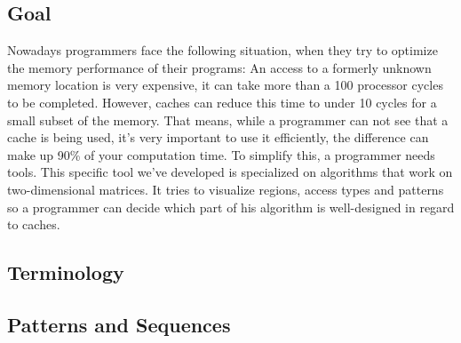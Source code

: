 \subsection{Goal}
Nowadays programmers face the following situation, when they try to optimize the memory performance of their programs: An access to a formerly unknown memory location is very expensive, it can take more than a 100 processor cycles to be completed. However, caches can reduce this time to under 10 cycles for a small subset of the memory. That means, while a programmer can not see that a cache is being used, it's very important to use it efficiently, the difference can make up 90\% of your computation time.\newline
To simplify this, a programmer needs tools. This specific tool we've developed is specialized on algorithms that work on two-dimensional matrices. It tries to visualize regions, access types and patterns so a programmer can decide which part of his algorithm is well-designed in regard to caches.

\subsection{Terminology}


\subsection{Patterns and Sequences}

